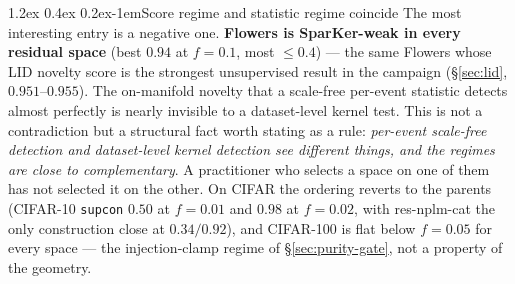 \documentclass{article}
\makeatletter
\renewcommand\paragraph{\@startsection{paragraph}{4}{\z@}%
  {1.2ex \@plus 0.4ex \@minus 0.2ex}{-1em}{\normalsize\bf}}
\makeatother
\begin{document}
\paragraph{Score regime and statistic regime coincide}
The most interesting entry is a negative one. \textbf{Flowers is SparKer-weak in
every residual space} (best $0.94$ at $f{=}0.1$, most $\le0.4$) --- the same
Flowers whose LID novelty score is the strongest unsupervised result in the
campaign (\S\ref{sec:lid}, $0.951$--$0.955$). The on-manifold novelty that a
scale-free per-event statistic detects almost perfectly is nearly invisible to a
dataset-level kernel test. This is not a contradiction but a structural fact
worth stating as a rule: \emph{per-event scale-free detection and dataset-level
kernel detection see different things, and the regimes are close to
complementary}. A practitioner who selects a space on one of them has not
selected it on the other. On CIFAR the ordering reverts to the parents (CIFAR-10
\texttt{supcon} $0.50$ at $f{=}0.01$ and $0.98$ at $f{=}0.02$, with res-nplm-cat
the only construction close at $0.34/0.92$), and CIFAR-100 is flat below
$f{=}0.05$ for every space --- the injection-clamp regime of
\S\ref{sec:purity-gate}, not a property of the geometry.
\end{document}
